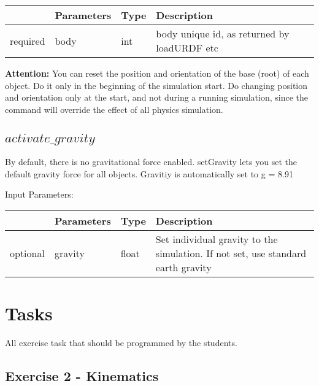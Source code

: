 \documentclass[
	ngerman,
	accentcolor=9c,%
	type=intern,
	marginpar=false
	]{tudapub}
\begin{document}
\vspace{0.5cm}

\begin{tabular}{|p{}|p{}|p{}| p{}|}
\hline
 & \textbf{Parameters} & \textbf{Type} & \textbf{Description} \\
\hline
required & body & int & body unique id, as returned by loadURDF etc \\
\hline
\end{tabular}

\vspace{0.5cm}
\noindent \textbf{Attention: } You can reset the position and orientation of the base (root) of each object. Do it only in the beginning of the simulation start. Do changing position and orientation only at the start, and not during a running simulation, since the command will override the effect of all physics simulation. 


\vspace{0.5cm}
\subsection{$activate\_gravity$}
\noindent By default, there is no gravitational force enabled. setGravity lets you set the default gravity force for all objects. Gravitiy is automatically set to g = 8.91

\vspace{0.5cm}
\noindent Input Parameters:
\vspace{0.5cm}

\begin{tabular}{|p{}|p{}|p{}| p{}|}
\hline
 & \textbf{Parameters} & \textbf{Type} & \textbf{Description} \\
\hline
optional & gravity & float & Set individual gravity to the simulation. If not set, use standard earth gravity \\
\hline
\end{tabular}


\newpage

\section{Tasks}
All exercise task that should be programmed by the students.

\vspace{0.5cm}
\subsection{Exercise 2 - Kinematics}
\end{document}
